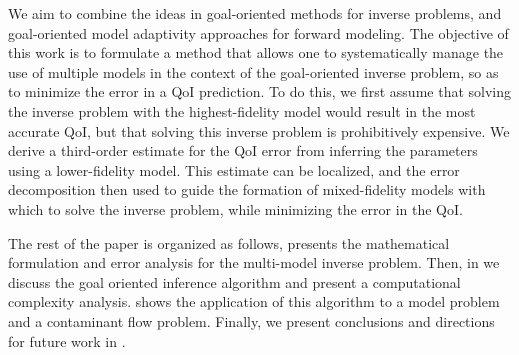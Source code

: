 
We aim to combine the ideas in goal-oriented methods for inverse problems, and goal-oriented model adaptivity approaches for forward modeling. The objective of this work is to formulate a method that allows one to systematically manage the use of multiple models in the context of the goal-oriented inverse problem, so as to minimize the error in a QoI prediction. To do this, we first assume that solving the inverse problem with the highest-fidelity model would result in the most accurate QoI, but that solving this inverse problem is prohibitively expensive. We derive a third-order estimate for the QoI error from inferring the parameters using a lower-fidelity model. This estimate can be localized, and the error decomposition then used to guide the formation of mixed-fidelity models with which to solve the inverse problem, while minimizing the error in the QoI. 

The rest of the paper is organized as follows,  presents the mathematical formulation and error analysis for the multi-model inverse problem. Then, in  we discuss the goal oriented inference algorithm and present a computational complexity analysis.  shows the application of this algorithm to a model problem and a contaminant flow problem. Finally, we present conclusions and directions for future work in .
